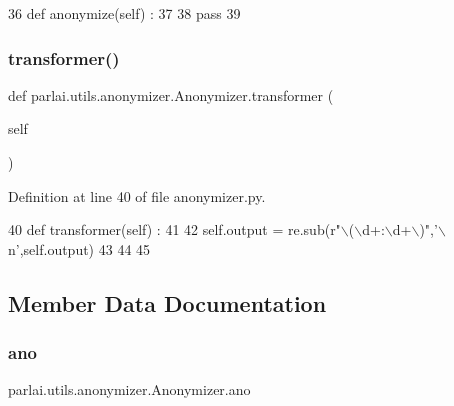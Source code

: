 \begin{DoxyCode}
36     \textcolor{keyword}{def }anonymize(self) : 
37 
38         \textcolor{keywordflow}{pass}
39 
\end{DoxyCode}
\mbox{\label{classparlai_1_1utils_1_1anonymizer_1_1Anonymizer_a515fed7848150c353175b42ebe7d06c1}} 
\subsubsection{\texorpdfstring{transformer()}{transformer()}}
{\footnotesize\ttfamily def parlai.\+utils.\+anonymizer.\+Anonymizer.\+transformer (\begin{DoxyParamCaption}\item[{}]{self }\end{DoxyParamCaption})}



Definition at line 40 of file anonymizer.\+py.


\begin{DoxyCode}
40     \textcolor{keyword}{def }transformer(self) : 
41 
42         self.output = re.sub(\textcolor{stringliteral}{r"\(\backslash\)(\(\backslash\)d+:\(\backslash\)d+\(\backslash\))"},\textcolor{stringliteral}{'\(\backslash\)n'},self.output)
43 
44 
45 
\end{DoxyCode}


\subsection{Member Data Documentation}
\mbox{\label{classparlai_1_1utils_1_1anonymizer_1_1Anonymizer_a93524d9b3d82d5cd637272cdf1dc816a}} 
\subsubsection{\texorpdfstring{ano}{ano}}
{\footnotesize\ttfamily parlai.\+utils.\+anonymizer.\+Anonymizer.\+ano}



